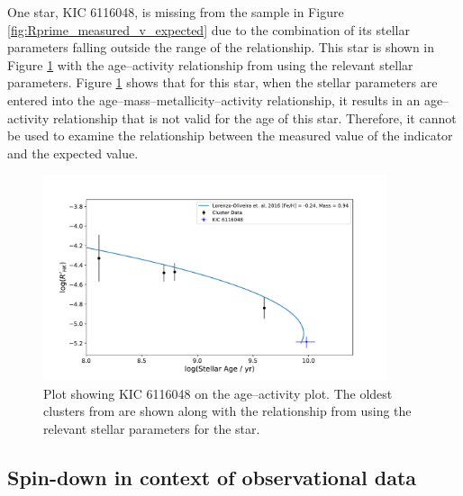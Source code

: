 One star, KIC 6116048, is missing from the sample in Figure \ref{fig:Rprime_measured_v_expected} due to the combination of its stellar parameters falling outside the range of the \citet{Lorenzo_Oliveira_etal_2016} relationship. This star is shown in Figure \ref{fig:LO_invalid_star} with the age--activity relationship from \citet{Lorenzo_Oliveira_etal_2016} using the relevant stellar parameters. Figure \ref{fig:LO_invalid_star} shows that for this star, when the stellar parameters are entered into the age--mass--metallicity--activity relationship, it results in an age--activity relationship that is not valid for the age of this star. Therefore, it cannot be used to examine the relationship between the measured value of the \Rprime indicator and the expected value.

\begin{figure}
	\centering
    \includegraphics[width=0.9\textwidth]{Figures/4-Chromospheric_age/rhk_KIC_6116048.pdf}
    \caption[Plot of age--activity relationship for stellar parameters of KIC 6116048]{Plot showing KIC 6116048 on the age--activity plot. The oldest clusters from \citet{Mamajek_Hillenbrand_2008} are shown along with the relationship from \citet{Lorenzo_Oliveira_etal_2016} using the relevant stellar parameters for the star.}
	\label{fig:LO_invalid_star}
\end{figure}

\subsection{Spin-down in context of observational data}
\label{Chp4_discus_spindown_context}

